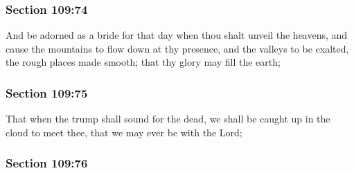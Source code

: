 
	\subsubsection{Section 109:74} %
		\label{DC109-74}

		And be adorned as a bride for that day when thou shalt unveil the heavens, and cause the mountains to flow down at thy presence, and the valleys to be exalted, the rough places made smooth; that thy glory may fill the earth;


	\subsubsection{Section 109:75} %
		\label{DC109-75}

		That when the trump shall sound for the dead, we shall be caught up in the cloud to meet thee, that we may ever be with the Lord;


	\subsubsection{Section 109:76} %
		\label{DC109-76}

